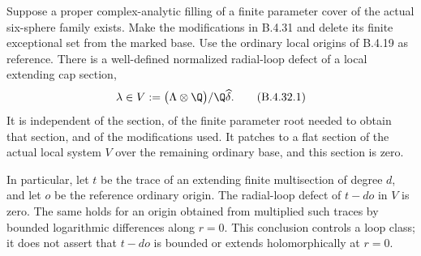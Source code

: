 \begin{proposition}\label{push:src:B.4.32}
\label{push:B432}
Suppose a proper complex-analytic filling of a finite parameter
cover of the actual six-sphere family exists. Make the
modifications in B.4.31 and delete its finite exceptional set
from the marked base. Use the ordinary local origins of
B.4.19 as reference. There is a well-defined normalized
radial-loop defect of a local extending cap section,
\[
 \lambda\in
 V:=\bigl(\Lambda\otimes\Q\bigr)/\Q\widehat\delta .
 \tag{B.4.32.1}
\]
It is independent of the section, of the finite parameter root
needed to obtain that section, and of the modifications used.
It patches to a flat section of the actual local system $V$
over the remaining ordinary base, and this section is zero.

In particular, let $t$ be the trace of an extending finite
multisection of degree $d$, and let $o$ be the reference ordinary
origin. The radial-loop defect of $t-do$ in $V$ is zero.
The same holds for an origin obtained from multiplied such
traces by bounded logarithmic differences along $r=0$.
This conclusion controls a loop class; it does not assert
that $t-do$ is bounded or extends holomorphically at $r=0$.
\end{proposition}

